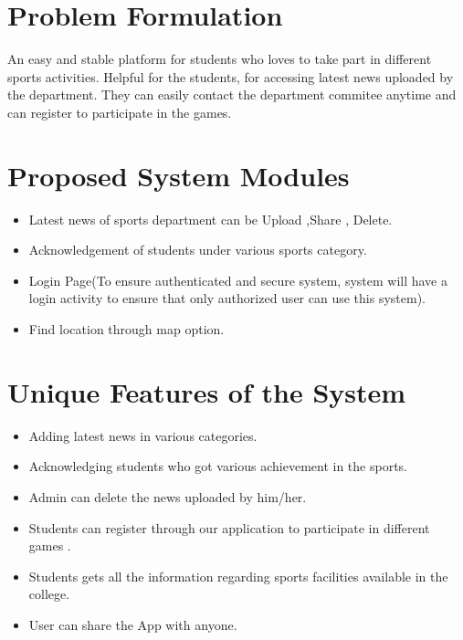 \section{Problem Formulation}
An easy and stable platform for students who loves to take part in different sports activities. Helpful for the students, for accessing latest news uploaded by the department. They can easily contact the department commitee anytime and can register to participate in the games. 

\section{Proposed System Modules}

\begin{itemize}
	\item Latest news of sports department can be Upload ,Share , Delete.

	\item Acknowledgement of students under various sports category.
	
	\item Login Page(To ensure authenticated and secure system, system will have a login activity to ensure that only authorized user can use this system).
	
	\item Find location through map option.
	


\end{itemize}

 
\section{Unique Features of the System}
\begin{itemize}

\item Adding latest news in various categories.
\item Acknowledging students who got various achievement in the sports.
\item Admin can delete the news uploaded by him/her.
\item Students can register through our application to participate in different games .
\item Students gets all the information regarding sports facilities available in the college.
\item User can share the App with anyone.
\end{itemize}



